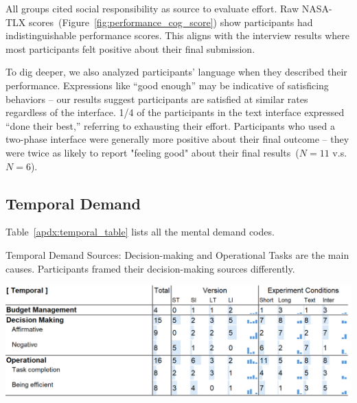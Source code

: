 All groups cited social responsibility as source to evaluate effort. Raw NASA-TLX scores~(Figure~\ref{fig:performance_cog_score}) show participants had indistinguishable performance scores. This aligns with the interview results where most participants felt positive about their final submission. 

To dig deeper, we also analyzed participants' language when they described their performance. Expressions like ``good enough'' may be indicative of satisficing behaviors -- our results suggest participants are satisfied at similar rates regardless of the interface. 1/4 of the participants in the text interface expressed ``done their best,'' referring to exhausting their effort. Participants who used a two-phase interface were generally more positive about their final outcome -- they were twice as likely to report "feeling good" about their final results~($N=11$ v.s. $N=6$).


\subsection{Temporal Demand}
Table~\ref{apdx:temporal_table} lists all the mental demand codes.
\label{apdx:temporal_table}
\begin{table}[ht]
    \caption{Temporal Demand Sources: Decision-making and Operational Tasks are the main causes. Participants framed their decision-making sources differently.}

    \label{tbl:temporal}
    \includegraphics[width=\linewidth]{content/image/cog/temporal_table.png}
\end{table}

